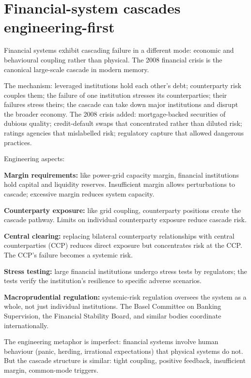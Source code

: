 \section{Financial-system cascades engineering-first}

Financial systems exhibit cascading failure in a different mode: economic and behavioural coupling rather than physical. The 2008 financial crisis is the canonical large-scale cascade in modern memory.

The mechanism: leveraged institutions hold each other's debt; counterparty risk couples them; the failure of one institution stresses its counterparties; their failures stress theirs; the cascade can take down major institutions and disrupt the broader economy. The 2008 crisis added: mortgage-backed securities of dubious quality; credit-default swaps that concentrated rather than diluted risk; ratings agencies that mislabelled risk; regulatory capture that allowed dangerous practices.

Engineering aspects:

\textbf{Margin requirements:} like power-grid capacity margin, financial institutions hold capital and liquidity reserves. Insufficient margin allows perturbations to cascade; excessive margin reduces system capacity.

\textbf{Counterparty exposure:} like grid coupling, counterparty positions create the cascade pathway. Limits on individual counterparty exposure reduce cascade risk.

\textbf{Central clearing:} replacing bilateral counterparty relationships with central counterparties (CCP) reduces direct exposure but concentrates risk at the CCP. The CCP's failure becomes a systemic risk.

\textbf{Stress testing:} large financial institutions undergo stress tests by regulators; the tests verify the institution's resilience to specific adverse scenarios.

\textbf{Macroprudential regulation:} systemic-risk regulation oversees the system as a whole, not just individual institutions. The Basel Committee on Banking Supervision, the Financial Stability Board, and similar bodies coordinate internationally.

The engineering metaphor is imperfect: financial systems involve human behaviour (panic, herding, irrational expectations) that physical systems do not. But the cascade structure is similar: tight coupling, positive feedback, insufficient margin, common-mode triggers.

